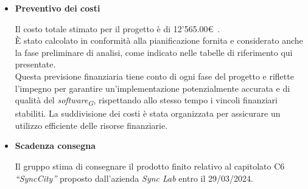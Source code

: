 \documentclass{article}
\begin{document}
\begin{itemize}
    \item[] \textbf{\fontsize{12}{6}\selectfont Preventivo dei costi} 

    Il costo totale stimato per il progetto è di 12'565.00\euro\ . \\ 
    È stato calcolato in conformità alla pianificazione fornita e considerato anche la fase preliminare di analisi, come indicato nelle tabelle di riferimento qui presentate.\\
    Questa previsione finanziaria tiene conto di ogni fase del progetto e riflette l’impegno per garantire un’implementazione potenzialmente accurata e di qualità del \textit{software}\textsubscript{\textit{G}}, rispettando allo stesso tempo i vincoli finanziari stabiliti. La suddivisione dei costi è stata organizzata per assicurare un utilizzo efficiente delle risorse finanziarie. 

    \vspace{0.5cm}

    \item[] \textbf{\fontsize{12}{6}\selectfont Scadenza consegna} 

    Il gruppo stima di consegnare il prodotto finito relativo al capitolato C6 \textit{“SyncCity”} proposto dall’azienda \textit{Sync Lab} entro il 29/03/2024.
\end{itemize}
\end{document}
